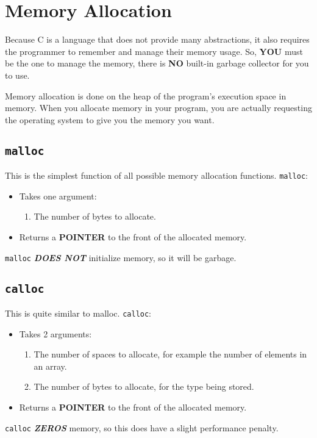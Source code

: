 \section{Memory Allocation}\label{sec:Memory_Allocation}
Because C is a language that does not provide many abstractions, it also requires the programmer to remember and manage their memory usage.
So, \textbf{YOU} must be the one to manage the memory, there is \textbf{NO} built-in garbage collector for you to use.

Memory allocation is done on the heap of the program's execution space in memory.
When you allocate memory in your program, you are actually requesting the operating system to give you the memory you want.

\subsection{\texttt{malloc}}\label{subsec:malloc}
This is the simplest function of all possible memory allocation functions.
\texttt{malloc}:
\begin{itemize}
\item Takes one argument:
  \begin{enumerate}
  \item The number of bytes to allocate.
  \end{enumerate}
\item Returns a \textbf{POINTER} to the front of the allocated memory.
\end{itemize}

\texttt{malloc} {\large{\textbf{\emph{DOES NOT}}}} initialize memory, so it will be garbage.

\subsection{\texttt{calloc}}\label{subsec:calloc}
This is quite similar to malloc.
\texttt{calloc}:
\begin{itemize}
\item Takes 2 arguments:
  \begin{enumerate}
  \item The number of spaces to allocate, for example the number of elements in an array.
  \item The number of bytes to allocate, for the type being stored.
  \end{enumerate}
\item Returns a \textbf{POINTER} to the front of the allocated memory.
\end{itemize}

\texttt{calloc} {\large{\textbf{\emph{ZEROS}}}} memory, so this does have a slight performance penalty.


